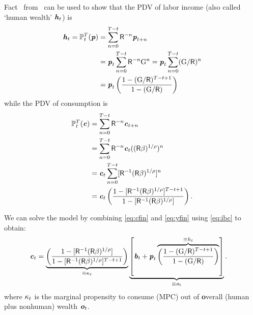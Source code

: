 \documentclass{scrartcl}
\begin{document}
Fact \FinSum~from \MathFactsList~can be used to show that the PDV of labor income (also called `human wealth'
$\boldsymbol{\mathit{h}}_{t}$) is
\begin{equation}\begin{gathered}\begin{aligned}
        \boldsymbol{\mathit{h}}_{t} = {\mathbb{P}}_{t}^{T}(\boldsymbol{\mathit{p}}) & =  \sum_{n=0}^{T-t} \mathsf{R}^{-n}\boldsymbol{\mathit{p}}_{t+n}
\\       & =  \boldsymbol{\mathit{p}}_{t}\sum_{n=0}^{T-t} \mathsf{R}^{-n}{\mathrm{G}}^{n} = \boldsymbol{\mathit{p}}_{t}\sum_{n=0}^{T-t} ({\mathrm{G}}/\mathsf{R})^{n}
\\   & =  \boldsymbol{\mathit{p}}_{t}\left(\frac{1-({\mathrm{G}}/\mathsf{R})^{T-t+1}}{1-({\mathrm{G}}/\mathsf{R})}\right)    \label{eq:yfin}
\end{aligned}\end{gathered}\end{equation}
while the PDV of consumption is
\begin{equation}\begin{gathered}\begin{aligned}
        {\mathbb{P}}_{t}^{T}(\boldsymbol{\mathit{c}}) & =  \sum_{n=0}^{T-t} \mathsf{R}^{-n}\boldsymbol{\mathit{c}}_{t+n}
\\       & =  \sum_{n=0}^{T-t} \mathsf{R}^{-n}\boldsymbol{\mathit{c}}_{t}((\mathsf{R}\beta)^{1/\rho})^{n}
\\       & =  \boldsymbol{\mathit{c}}_{t} \sum_{n=0}^{T-t} [\mathsf{R}^{-1}(\mathsf{R}\beta)^{1/\rho}]^{n}
\\   & =  \boldsymbol{\mathit{c}}_{t}\left(\frac{1-[\mathsf{R}^{-1}(\mathsf{R}\beta)^{1/\rho}]^{T-t+1}}{1-[\mathsf{R}^{-1}(\mathsf{R}\beta)^{1/\rho}]}\right) \label{eq:cfin}.
\end{aligned}\end{gathered}\end{equation}

\hypertarget{cFuncAnalytical}{}
We can solve the model by combining \eqref{eq:cfin} and \eqref{eq:yfin} using 
\eqref{eq:ibc} to obtain:
\begin{equation}\begin{gathered}\begin{aligned}
        \boldsymbol{\mathit{c}}_{t} & =  \underbrace{\left(\frac{1-[\mathsf{R}^{-1}(\mathsf{R}\beta)^{1/\rho}]}{1-[\mathsf{R}^{-1}(\mathsf{R}\beta)^{1/\rho}]^{T-t+1}}\right)}_{\equiv \kappa_{t}} \underbrace{\left[\boldsymbol{\mathit{b}}_{t}+\boldsymbol{\mathit{p}}_{t}\overbrace{\left(\frac{1-({\mathrm{G}}/\mathsf{R})^{T-t+1}}{1-({\mathrm{G}}/\mathsf{R})}\right)}^{\equiv h_{t}}\right]}_{\equiv \boldsymbol{\mathit{o}}_{t}} \label{eq:cfinhoriz}.
\end{aligned}\end{gathered}\end{equation}
where $\kappa_{t}$ is the marginal propensity to consume (MPC) out of \textbf{o}verall (human plus nonhuman) wealth $\boldsymbol{\mathit{o}}_{t}$.
\end{document}
